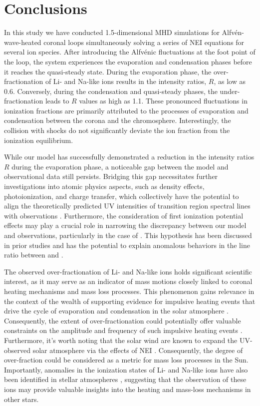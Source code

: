 \documentclass[fleqn,usenatbib]{mnras}
\begin{document}
\section{Conclusions}
In this study we have conducted 1.5-dimensional MHD simulations for Alfv\'{e}n-wave-heated coronal loops simultaneously solving a series of NEI equations for several ion species. 
After introducing the Alfv\'{e}nic fluctuations at the foot point of the loop, the system experiences the evaporation and condensation phases before it reaches the quasi-steady state.
During the evaporation phase, the over-fractionation of Li- and Na-like ions results in the intensity ratios, $R$, as low as 0.6. Conversely, during the condensation and quasi-steady phases, the under-fractionation leads to $R$ values as high as 1.1. These pronounced fluctuations in ionization fractions are primarily attributed to the processes of evaporation and condensation between the corona and the chromosphere. Interestingly, the collision with shocks do not significantly deviate the  ion fraction from the ionization equilibrium.

While our model has successfully demonstrated a reduction in the intensity ratios $R$ during the evaporation phase, a noticeable gap between the model and observational data still persists. Bridging this gap necessitates further investigations into atomic physics aspects, such as density effects, photoionization, and charge transfer, which collectively have the potential to align the theoretically predicted UV intensities of transition region spectral lines with observations \citep{2023MNRAS.521.4696D}.
Furthermore, the consideration of first ionization potential effects may play a crucial role in narrowing the discrepancy between our model and observations, particularly in the case of . This hypothesis has been discussed in prior studies and has the potential to explain anomalous behaviors in the line ratio between  and  \citep{2015ApJ...802....5O,2016ApJ...817...46M}.

The observed over-fractionation of Li- and Na-like ions holds significant scientific interest, as it may serve as an indicator of mass motions closely linked to coronal heating mechanisms and mass loss processes. This phenomenon gains relevance in the context of the wealth of supporting evidence for impulsive heating events that drive the cycle of evaporation and condensation in the solar atmosphere \citep{2006SoPh..234...41K}. Consequently, the extent of over-fractionation could potentially offer valuable constraints on the amplitude and frequency of such impulsive heating events \citep{2011ApJS..194...26B}.
Furthermore, it's worth noting that the solar wind are known to expand the UV-observed solar atmosphere via the effects of NEI \citep{1964spre.conf..730N,1978ApJ...226..698M,1979ApJ...229L.101D}. Consequently, the degree of over-fraction could be considered as a metric for mass loss processes in the Sun. Importantly, anomalies in the ionization states of Li- and Na-like ions have also been identified in stellar atmospheres \citep{2002A&A...385..968D}, suggesting that the observation of these ions may provide valuable insights into the heating and mass-loss mechanisms in other stars.
\end{document}
